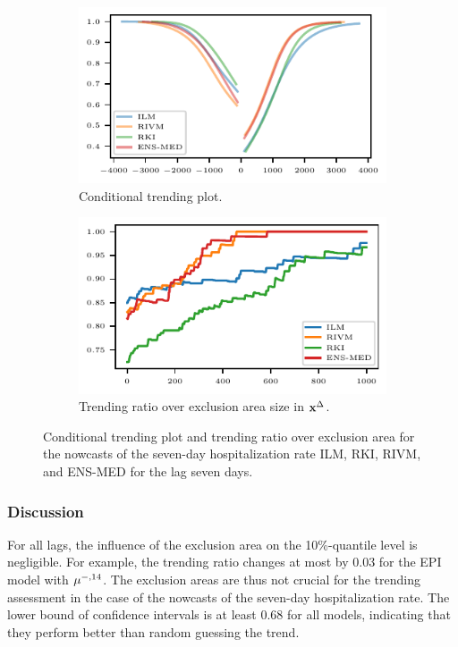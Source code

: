 \begin{figure}
    \centering
    \begin{subfigure}[t]{.48\textwidth}
    \includegraphics{plots/covid_nowcast/40_cond_prob_lag_7}
    \caption{Conditional trending plot.}\label{fig:app-covid-cond-prob-7}
    \end{subfigure}\hfill
    \begin{subfigure}[t]{.48\textwidth}
    \includegraphics{plots/covid_nowcast/40_acc_eps_lag_7}
    \caption{Trending ratio over exclusion area size in $\mathbf{x}^{\Delta}$.}\label{fig:app-covid-trending-ratio-7}
    \end{subfigure}
    \caption{Conditional trending plot and trending ratio over exclusion area for the nowcasts of the seven-day hospitalization rate ILM, RKI, RIVM, and ENS-MED for the lag seven days.}
    \label{fig:app-covid-cond-prob-trending-ratio-7}
\end{figure}



\subsubsection*{Discussion}

For all lags, the influence of the exclusion area on the 10\%-quantile level is negligible.
For example, the trending ratio changes at most by 0.03 for the EPI model with $\mu^{-, 14}$.
The exclusion areas are thus not crucial for the trending assessment in the case of the nowcasts of the seven-day hospitalization rate.
The lower bound of confidence intervals is at least 0.68 for all models, indicating that they perform better than random guessing the trend.

